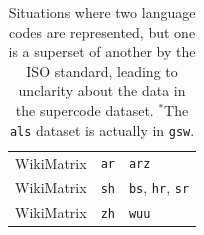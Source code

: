 \begin{table}[th!]
\begin{tabular}{lll}
        \midrule
        WikiMatrix        & \texttt{ar}        & \texttt{arz}                              \\
        WikiMatrix        & \texttt{sh}        & \texttt{bs}, \texttt{hr}, \texttt{sr}     \\
        WikiMatrix        & \texttt{zh}        & \texttt{wuu}                              \\
        \bottomrule
    \end{tabular}
    \caption{Situations where two language codes are represented, but one is a superset of another by the ISO standard, leading to unclarity about the data in the supercode dataset. $^{*}$The \texttt{als} dataset is actually in \texttt{gsw}.}
    \label{tab:supersets}
\end{table}


